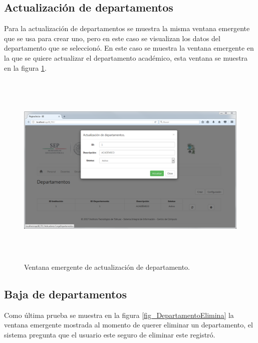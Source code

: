 			\subsection{Actualizaci\'on de departamentos}

			Para la actualizaci\'on de departamentos se muestra la misma ventana emergente que se usa para crear uno, pero en este caso se visualizan los datos del departamento que se seleccion\'o. En este caso se muestra la ventana emergente en la que se quiere actualizar el departamento acad\'emico, esta ventana se muestra en la figura \ref{fig_DepartamentoActualiza}.

			\begin{figure}[]
		        \centering
		        \includegraphics[width=16cm, height=9.5cm]{figuras/DepartamentosActualiza}
		        \caption{Ventana emergente de actualizaci\'on de departamento.}
		        \label{fig_DepartamentoActualiza}
		    \end{figure}

		    \subsection{Baja de departamentos}

		    Como \'ultima prueba se muestra en la figura \ref{fig_DepartamentoElimina} la ventana emergente mostrada al momento de querer eliminar un departamento, el sistema pregunta que el usuario este seguro de eliminar este registr\'o.\\\\\\\\\\

